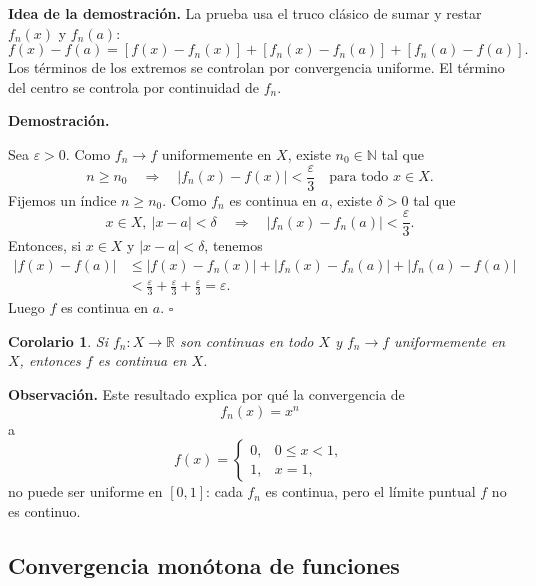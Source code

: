 \documentclass[11pt,a4paper,openany]{book}
\theoremstyle{definition}
\theoremstyle{plain}
\newtheorem{corolario}{Corolario}[chapter]
\theoremstyle{remark}
\renewenvironment{proof}[1][\textbf{Demostración.}]{%
  \par\noindent #1\ \normalfont
}{\hfill$\square$\par\medskip}
\newenvironment{observacion}
{\par\medskip\noindent\textbf{Observación. }\normalfont}
{\par\medskip}
\newenvironment{idea}
{\begin{comentariolibro}\textbf{Idea de la demostración. }\normalfont}
{\end{comentariolibro}}
\newcommand{\R}{\mathbb{R}}
\newcommand{\N}{\mathbb{N}}
\begin{document}
\begin{idea}
La prueba usa el truco clásico de sumar y restar $f_n(x)$ y $f_n(a)$:
\[
    f(x)-f(a)
    =
    [f(x)-f_n(x)]
    +
    [f_n(x)-f_n(a)]
    +
    [f_n(a)-f(a)].
\]
Los términos de los extremos se controlan por convergencia uniforme. El término
del centro se controla por continuidad de $f_n$.
\end{idea}

\begin{proof}
Sea $\varepsilon>0$. Como $f_n\to f$ uniformemente en $X$, existe
$n_0\in\N$ tal que
\[
    n\geq n_0
    \quad\Longrightarrow\quad
    |f_n(x)-f(x)|<\frac{\varepsilon}{3}
    \quad\text{para todo }x\in X.
\]
Fijemos un índice $n\geq n_0$. Como $f_n$ es continua en $a$, existe
$\delta>0$ tal que
\[
    x\in X,\ |x-a|<\delta
    \quad\Longrightarrow\quad
    |f_n(x)-f_n(a)|<\frac{\varepsilon}{3}.
\]
Entonces, si $x\in X$ y $|x-a|<\delta$, tenemos
\[
\begin{aligned}
    |f(x)-f(a)|
    &\leq |f(x)-f_n(x)|
        +|f_n(x)-f_n(a)|
        +|f_n(a)-f(a)|  \\
    &< \frac{\varepsilon}{3}
        +\frac{\varepsilon}{3}
        +\frac{\varepsilon}{3}
    =\varepsilon.
\end{aligned}
\]
Luego $f$ es continua en $a$.
\end{proof}

\begin{corolario}
Si $f_n:X\to\R$ son continuas en todo $X$ y $f_n\to f$ uniformemente en $X$,
entonces $f$ es continua en $X$.
\end{corolario}

\begin{observacion}
Este resultado explica por qué la convergencia de
\[
    f_n(x)=x^n
\]
a
\[
    f(x)=
    \begin{cases}
        0, & 0\leq x<1,\\
        1, & x=1,
    \end{cases}
\]
no puede ser uniforme en $[0,1]$: cada $f_n$ es continua, pero el límite puntual
$f$ no es continuo.
\end{observacion}

\subsection{Convergencia monótona de funciones}
\end{document}
